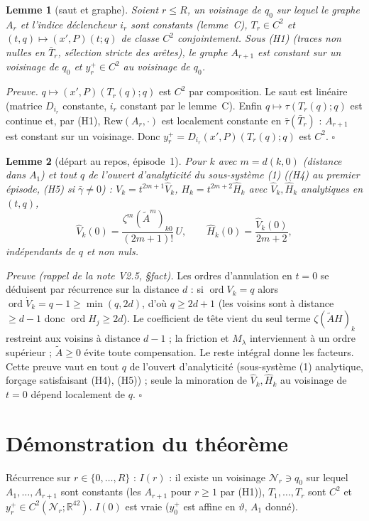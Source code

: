 \documentclass[11pt,a4paper]{article}
\newtheorem{lemme}{Lemme}
\theoremstyle{remark}
\newcommand{\R}{\mathbb R}
\newcommand{\vth}{\vartheta}
\begin{document}
\begin{lemme}[saut et graphe]\label{lem:D}Soient $r\le R$, un voisinage de $q_0$ sur lequel le graphe $A_r$ et l'indice d\'eclencheur $i_r$ sont constants (lemme~C), $T_r\in C^2$ et $(t,q)\mapsto(x',P)(t;q)$ de classe $C^2$ conjointement. Sous (H1) (traces non nulles en $\bar T_r$, s\'election stricte des ar\^etes), le graphe $A_{r+1}$ est constant sur un voisinage de $q_0$ et $y_r^+\in C^2$ au voisinage de $q_0$.\end{lemme}
\emph{Preuve.} $q\mapsto(x',P)(T_r(q);q)$ est $C^2$ par composition. Le saut est lin\'eaire (matrice $D_{i_r}$ constante, $i_r$ constant par le lemme~C). Enfin $q\mapsto\tau(T_r(q);q)$ est continue et, par (H1), $\mathrm{Rew}(A_r,\cdot)$ est localement constante en $\bar\tau(\bar T_r)$ : $A_{r+1}$ est constant sur un voisinage. Donc $y_r^+=D_{i_r}(x',P)(T_r(q);q)$ est $C^2$. $\square$

\begin{lemme}[d\'epart au repos, \'episode~1]\label{lem:fact}Pour $k$ avec $m=d(k,0)$ (distance dans $A_1$) et tout $q$ de l'ouvert d'analyticit\'e du sous-syst\`eme (1) ((H4) au premier \'episode, (H5) si $\bar\gamma\neq0$) : $V_k=t^{2m+1}\hat V_k$, $H_k=t^{2m+2}\hat H_k$ avec $\hat V_k,\hat H_k$ analytiques en $(t,q)$,
\[ \hat V_k(0)=\frac{\zeta^m(\tilde A^m)_{k0}}{(2m+1)!}\,U,\qquad \hat H_k(0)=\frac{\hat V_k(0)}{2m+2}, \]
ind\'ependants de $q$ et non nuls.\end{lemme}
\emph{Preuve (rappel de la note V2.5, \S fact).} Les ordres d'annulation en $t=0$ se d\'eduisent par r\'ecurrence sur la distance $d$ : si $\operatorname{ord}V_k=q$ alors $\operatorname{ord}\dot V_k=q-1\ge\min(q,2d)$, d'o\`u $q\ge2d+1$ (les voisins sont \`a distance $\ge d-1$ donc $\operatorname{ord}H_j\ge2d$). Le coefficient de t\^ete vient du seul terme $\zeta(\tilde AH)_k$ restreint aux voisins \`a distance $d-1$ ; la friction et $M_\lambda$ interviennent \`a un ordre sup\'erieur ; $\tilde A\ge0$ \'evite toute compensation. Le reste int\'egral donne les facteurs. Cette preuve vaut en tout $q$ de l'ouvert d'analyticit\'e (sous-syst\`eme (1) analytique, for\c{c}age satisfaisant (H4), (H5)) ; seule la minoration de $\hat V_k,\hat H_k$ au voisinage de $t=0$ d\'epend localement de $q$. $\square$

\section{D\'emonstration du th\'eor\`eme}
R\'ecurrence sur $r\in\{0,\dots,R\}$ : \textbf{$I(r)$} : il existe un voisinage $\mathcal N_r\ni q_0$ sur lequel $A_1,\dots,A_{r+1}$ sont constants (les $A_{r+1}$ pour $r\ge1$ par (H1)), $T_1,\dots,T_r$ sont $C^2$ et $y_r^+\in C^2(\mathcal N_r;\R^{42})$. $I(0)$ est vraie ($y_0^+$ est affine en $\vth$, $A_1$ donn\'e).
\end{document}

